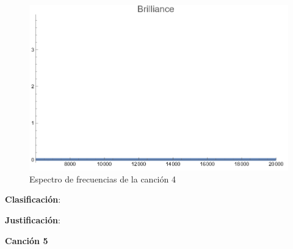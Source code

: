 \documentclass[12pt, letterpaper]{article}
\begin{document}
\begin{figure}[H]
\begin{minipage}{.3\textwidth}
  \end{minipage}
  \begin{minipage}{0.03\textwidth}\end{minipage}
  \begin{minipage}{.3\textwidth}
    \centering
    \includegraphics[width=.9\linewidth]{imgs/Cancion4/brilliance.png}
  \end{minipage}
  \caption{Espectro de frecuencias de la canción 4}
  \label{fig:esp04}
\end{figure}

\textbf{Clasificación}: 

\textbf{Justificación}: 

\newpage

\textbf{\large{Canción 5}}
\end{document}
